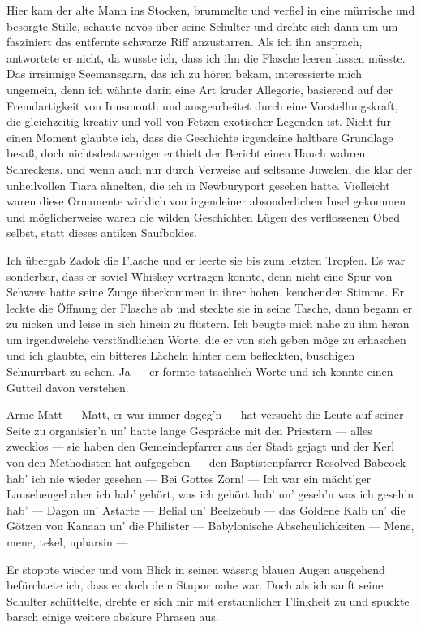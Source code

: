 Hier kam der alte Mann ins Stocken, brummelte und verfiel in eine mürrische und besorgte Stille, schaute nevös über seine Schulter und drehte sich dann um um fasziniert das entfernte schwarze Riff anzustarren. Als ich ihn ansprach, antwortete er nicht, da wusste ich, dass ich ihn die Flasche leeren lassen müsste. Das irrsinnige Seemansgarn, das ich zu hören bekam, interessierte mich ungemein, denn ich wähnte darin eine Art kruder Allegorie, basierend auf der Fremdartigkeit von Innsmouth und ausgearbeitet durch eine Vorstellungskraft, die gleichzeitig kreativ und voll von Fetzen exotischer Legenden ist. Nicht für einen Moment glaubte ich, dass die Geschichte irgendeine haltbare Grundlage besaß, doch nichtsdestoweniger enthielt der Bericht einen Hauch wahren Schreckens. und wenn auch nur durch Verweise auf seltsame Juwelen, die klar der unheilvollen Tiara ähnelten, die ich in Newburyport gesehen hatte. Vielleicht waren diese Ornamente wirklich von irgendeiner absonderlichen Insel gekommen und möglicherweise waren die wilden Geschichten Lügen des verflossenen Obed selbst, statt dieses antiken Saufboldes.

Ich übergab Zadok die Flasche und er leerte sie bis zum letzten Tropfen. Es war sonderbar, dass er soviel Whiskey vertragen konnte, denn nicht eine Spur von Schwere hatte seine Zunge überkommen in ihrer hohen, keuchenden Stimme. Er leckte die Öffnung der Flasche ab und steckte sie in seine Tasche, dann begann er zu nicken und leise in sich hinein zu flüstern. Ich beugte mich nahe zu ihm heran um irgendwelche verständlichen Worte, die er von sich geben möge zu erhaschen und ich glaubte, ein bitteres Lächeln hinter dem befleckten, buschigen Schnurrbart zu sehen. Ja --- er formte tatsächlich Worte und ich konnte einen Gutteil davon verstehen.

\glqq Arme Matt --- Matt, er war immer dageg'n --- hat versucht die Leute auf seiner Seite zu organisier'n un' hatte lange Gespräche mit den Priestern --- alles zwecklos --- sie haben den Gemeindepfarrer aus der Stadt gejagt und der Kerl von den Methodisten hat aufgegeben --- den Baptistenpfarrer Resolved Babcock hab' ich nie wieder gesehen --- Bei Gottes Zorn! --- Ich war ein mächt'ger Lausebengel aber ich hab' gehört, was ich gehört hab' un' geseh'n was ich geseh'n hab' --- Dagon un' Astarte --- Belial un' Beelzebub --- das Goldene Kalb un' die Götzen von Kanaan un' die Philister --- Babylonische Abscheulichkeiten --- Mene, mene, tekel, upharsin ---\grqq

Er stoppte wieder und vom Blick in seinen wässrig blauen Augen ausgehend befürchtete ich, dass er doch dem Stupor nahe war. Doch als ich sanft seine Schulter schüttelte, drehte er sich mir mit erstaunlicher Flinkheit zu und spuckte barsch einige weitere obskure Phrasen aus.

